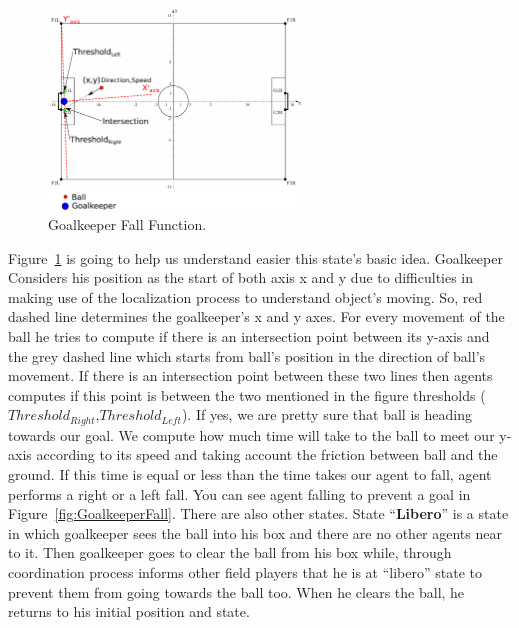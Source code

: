 \begin{figure}[t!]
\centering
  \includegraphics[trim = 0cm 0cm 10cm 0cm, clip,width=0.6\textwidth]{Chapter3/figures/Goalie.pdf}  
  \caption{Goalkeeper Fall Function.}
  \label{fig:Goalkeeper}
\end{figure} 

Figure~\ref{fig:Goalkeeper} is going to help us understand easier this state's basic idea. Goalkeeper Considers his position as the start of both axis x and y due to difficulties in making use of the localization process to understand object's moving. So, red dashed line determines the goalkeeper's x and y axes. For every movement of the ball he tries to compute if there is an intersection point between its y-axis and the grey dashed line which starts from ball's position in the direction of ball's movement. If there is an intersection point between these two lines then agents computes if this point is between the two mentioned in the figure thresholds ($Threshold_{Right}$,$Threshold_{Left}$). If yes, we are pretty sure that ball is heading towards our goal. We compute how much time will take to the ball to meet our y-axis according to its speed and taking account the friction between ball and the ground. If this time is equal or less than the time takes our agent to fall, agent performs a right or a left fall. You can see agent falling to prevent a goal in Figure~\ref{fig:GoalkeeperFall}. There are also other states. State ``\textbf{Libero}'' is a state in which goalkeeper sees the ball into his box and there are no other agents near to it. Then goalkeeper goes to clear the ball from his box while, through coordination process informs other field players that he is at ``libero'' state to prevent them from going towards the ball too. When he clears the ball, he returns to his initial position and state. 

